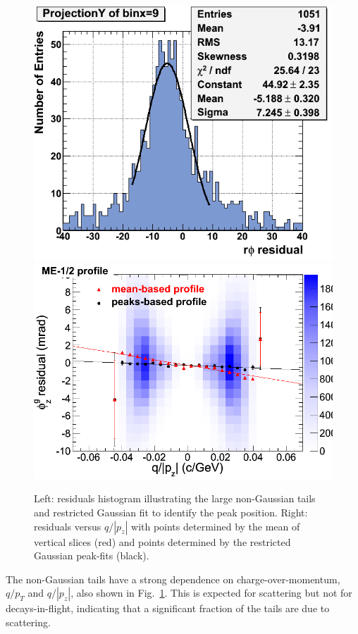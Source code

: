 \documentclass[12pt]{article}
\begin{document}
\begin{figure}
\includegraphics[height=6 cm]{residuals_peak_fit.png} \hfill
\includegraphics[height=6 cm]{residuals_qoverpz_fit.png}

\caption{Left: residuals histogram illustrating the large non-Gaussian
  tails and restricted Gaussian fit to identify the peak position.
  Right: residuals versus $q/|p_z|$ with points determined by the mean
  of vertical slices (red) and points determined by the restricted
  Gaussian peak-fits (black). \label{fig:residuals_peak_fit}}
\end{figure}

The non-Gaussian tails have a strong dependence on
charge-over-momentum, $q/p_T$ and $q/|p_z|$, also shown in
Fig.~\ref{fig:residuals_peak_fit}.  This is expected for scattering
but not for decays-in-flight, indicating that a significant fraction
of the tails are due to scattering.
\end{document}
